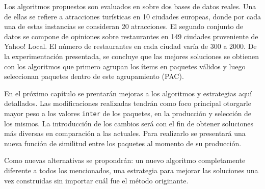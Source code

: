Los algoritmos propuestos son evaluados en \cite{journals/tkde/Amer-YahiaBCFMZ14} sobre dos bases de datos reales. Una de ellas se refiere a atracciones turísticas en 10 ciudades europeas, donde por cada una de estas instancias se consideran 20 atracciones. El segundo conjunto de datos se compone de opiniones sobre restaurantes en 149 ciudades proveniente de Yahoo! Local. El número de restaurantes en cada ciudad varía de 300 a 2000. De la experimentación presentada, se concluye que las mejores soluciones se obtienen con los algoritmos que primero agrupan los ítems en paquetes válidos y luego seleccionan paquetes dentro de este agrupamiento (PAC).

En el próximo capítulo se prentarán mejoras a los algoritmos y estrategias aquí detallados. Las modificaciones realizadas tendrán como foco principal otorgarle mayor peso a los valores \texttt{inter} de los paquetes, en la producción y selección de los mismos. La introducción de los cambios será con el fin de obtener soluciones más diversas en comparación a las actuales. Para realizarlo se presentará una nueva función de similitud entre los paquetes al momento de su producción. 

Como nuevas alternativas se propondrán: un nuevo algoritmo completamente diferente a todos los mencionados, una estrategia para mejorar las soluciones una vez construidas sin importar cuál fue el método originante.
